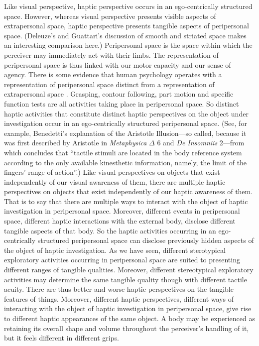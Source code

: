 Like visual perspective, haptic perspective occurs in an ego-centrically structured space. However, whereas visual perspective presents visible aspects of extrapersonal space, haptic perspective presents tangible aspects of peripersonal space. (Deleuze's and Guattari's \citeyear[Chapter 14]{Deleuze:1987rr} discussion of smooth and striated space makes an interesting comparison here.) Peripersonal space is the space within which the perceiver may immediately act with their limbs. The representation of peripersonal space is thus linked with our motor capacity and our sense of agency. There is some evidence that human psychology operates with a representation of peripersonal space distinct from a representation of extrapersonal space \citep{Halligan:1991yf}. 
Grasping, contour following, part motion and specific function tests are all activities taking place in peripersonal space. So distinct haptic activities that constitute distinct haptic perspectives on the object under investigation occur in an ego-centrically structured peripersonal space. (See, for example, Benedetti's \citeyear{Benedetti:1985qe} explanation of the Aristotle Illusion---so called, because it was first described by Aristotle in \emph{Metaphysica} \( \Delta \) 6 and \emph{De Insomniis} 2---from which \citealt[524]{Benedetti:1985qe} concludes that ``tactile stimuli are located in the body reference system according to the only available kinesthetic information, namely, the limit of the fingers' range of action''.) Like visual perspectives on objects that exist independently of our visual awareness of them, there are multiple haptic perspectives on objects that exist independently of our haptic awareness of them. That is to say that there are multiple ways to interact with the object of haptic investigation in peripersonal space. Moreover, different events in peripersonal space, different haptic interactions with the external body, disclose different tangible aspects of that body. So the haptic activities occurring in an ego-centrically structured peripersonal space can disclose previously hidden aspects of the object of haptic investigation. As we have seen, different sterotypical exploratory activities occurring in peripersonal space are suited to presenting different ranges of tangible qualities. Moreover, different stereotypical exploratory activities may determine the same tangible quality though with different tactile acuity. There are thus better and worse haptic perspectives on the tangible features of things. Moreover, different haptic perspectives, different ways of interacting with the object of haptic investigation in peripersonal space, give rise to different haptic appearances of the same object. A body may be experienced as retaining its overall shape and volume throughout the perceiver's handling of it, but it feels different in different grips.

